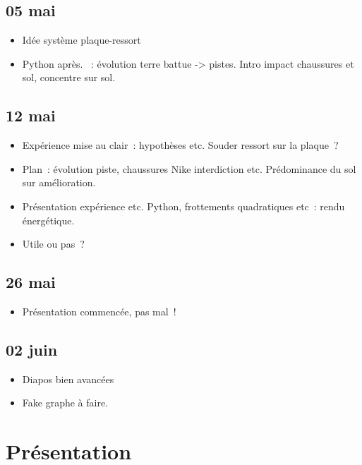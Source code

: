 \documentclass[a4paper, 11pt, final, garamond]{book}
\begin{document}
\subsection{05 mai}
\begin{itemize}
  \item Idée système plaque-ressort
  \item Python après.
  ~: évolution terre battue -> pistes. Intro impact chaussures et
  sol, concentre sur sol.
\end{itemize}

\subsection{12 mai}
\begin{itemize}
  \item Expérience mise au clair~: hypothèses etc. Souder ressort sur la
    plaque~?
  \item Plan~: évolution piste, chaussures Nike interdiction etc. Prédominance
    du sol sur amélioration.
  \item Présentation expérience etc. Python, frottements quadratiques etc~:
    rendu énergétique.
  \item Utile ou pas~?
\end{itemize}

\subsection{26 mai}
\begin{itemize}
  \item Présentation commencée, pas mal~!
\end{itemize}

\subsection{02 juin}
\begin{itemize}
  \item Diapos bien avancées
  \item Fake graphe à faire.
\end{itemize}

\section{Présentation}
\end{document}

